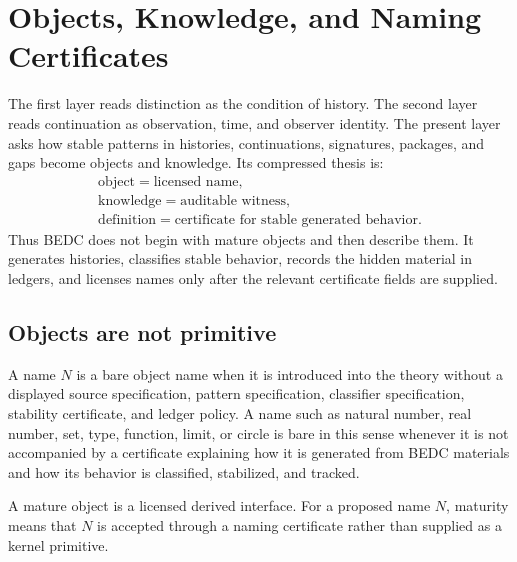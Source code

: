 \section{Objects, Knowledge, and Naming Certificates}
\label{sec:visions-philosophy-object-knowledge-namecert}

The first layer reads distinction as the condition of history. The
second layer reads continuation as observation, time, and observer
identity. The present layer asks how stable patterns in histories,
continuations, signatures, packages, and gaps become objects and
knowledge. Its compressed thesis is:
$$
\begin{gathered}
\text{object}=\text{licensed name},\\
\text{knowledge}=\text{auditable witness},\\
\text{definition}=\text{certificate for stable generated behavior}.
\end{gathered}
$$
Thus BEDC does not begin with mature objects and then describe them. It
generates histories, classifies stable behavior, records the hidden
material in ledgers, and licenses names only after the relevant
certificate fields are supplied.

\subsection{Objects are not primitive}
\label{subsec:philosophy-objects-not-primitive}

\begin{definition}
\label{def:philosophy-bare-object}
A name \(N\) is a bare object name when it is introduced into the
theory without a displayed source specification, pattern
specification, classifier specification, stability certificate, and
ledger policy. A name such as natural number, real number, set, type,
function, limit, or circle is bare in this sense whenever it is not
accompanied by a certificate explaining how it is generated from BEDC
materials and how its behavior is classified, stabilized, and tracked.
\end{definition}

\begin{definition}
\label{def:philosophy-mature-object}
A mature object is a licensed derived interface. For a proposed name
\(N\), maturity means that \(N\) is accepted through a naming
certificate rather than supplied as a kernel primitive.
\end{definition}

